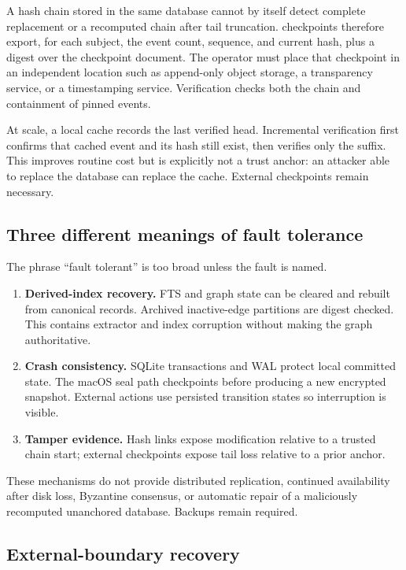 A hash chain stored in the same database cannot by itself detect complete replacement or a recomputed chain after tail truncation. \system{} checkpoints therefore export, for each subject, the event count, sequence, and current hash, plus a digest over the checkpoint document. The operator must place that checkpoint in an independent location such as append-only object storage, a transparency service, or a timestamping service. Verification checks both the chain and containment of pinned events.

At scale, a local cache records the last verified head. Incremental verification first confirms that cached event and its hash still exist, then verifies only the suffix. This improves routine cost but is explicitly not a trust anchor: an attacker able to replace the database can replace the cache. External checkpoints remain necessary.

\subsection{Three different meanings of fault tolerance}

The phrase ``fault tolerant'' is too broad unless the fault is named.

\begin{enumerate}
  \item \textbf{Derived-index recovery.} FTS and graph state can be cleared and rebuilt from canonical records. Archived inactive-edge partitions are digest checked. This contains extractor and index corruption without making the graph authoritative.
  \item \textbf{Crash consistency.} SQLite transactions and WAL protect local committed state. The macOS seal path checkpoints before producing a new encrypted snapshot. External actions use persisted transition states so interruption is visible.
  \item \textbf{Tamper evidence.} Hash links expose modification relative to a trusted chain start; external checkpoints expose tail loss relative to a prior anchor.
\end{enumerate}

These mechanisms do not provide distributed replication, continued availability after disk loss, Byzantine consensus, or automatic repair of a maliciously recomputed unanchored database. Backups remain required.

\subsection{External-boundary recovery}

